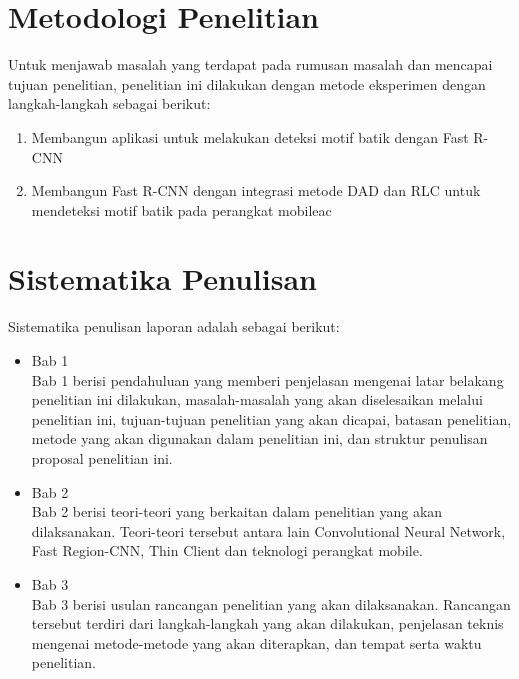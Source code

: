 \section{Metodologi Penelitian}
Untuk menjawab masalah yang terdapat pada rumusan masalah dan mencapai tujuan penelitian, penelitian ini dilakukan dengan metode eksperimen dengan langkah-langkah sebagai berikut:
\begin{enumerate}
	\item Membangun aplikasi untuk melakukan deteksi motif batik dengan Fast R-CNN
	\item Membangun Fast R-CNN dengan integrasi metode DAD dan RLC untuk mendeteksi motif batik pada perangkat mobileac
\end{enumerate}

\section{Sistematika Penulisan}
Sistematika penulisan laporan adalah sebagai berikut:
\begin{itemize}
	\item Bab 1 \babSatu \\
	Bab 1 berisi pendahuluan yang memberi penjelasan mengenai latar belakang penelitian ini dilakukan, masalah-masalah yang akan diselesaikan melalui penelitian ini, tujuan-tujuan penelitian yang akan dicapai, batasan penelitian, metode yang akan digunakan dalam penelitian ini, dan struktur penulisan proposal penelitian ini.
	\item Bab 2 \babDua \\
	Bab 2 berisi teori-teori yang berkaitan dalam penelitian yang akan dilaksanakan. Teori-teori tersebut antara lain Convolutional Neural Network, Fast Region-CNN, Thin Client dan teknologi perangkat mobile.
	\item Bab 3 \babTiga \\
	Bab 3 berisi usulan rancangan penelitian yang akan dilaksanakan. Rancangan tersebut terdiri dari langkah-langkah yang akan dilakukan, penjelasan teknis mengenai metode-metode yang akan diterapkan, dan tempat serta waktu penelitian.
\end{itemize}


